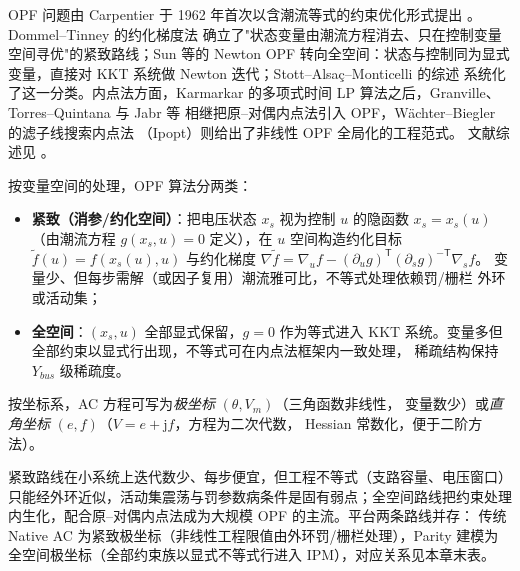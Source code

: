 \begin{remark}[发展脉络]\label{rem:opf-th-gen-history}
OPF 问题由 Carpentier 于 1962 年首次以含潮流等式的约束优化形式提出
\cite{opft:carpentier}。Dommel--Tinney 的约化梯度法\cite{opft:dommel-tinney}
确立了"状态变量由潮流方程消去、只在控制变量空间寻优"的紧致路线；Sun 等的
Newton OPF\cite{opft:sun-etal} 转向全空间：状态与控制同为显式变量，直接对
KKT 系统做 Newton 迭代；Stott--Alsa\c{c}--Monticelli 的综述
\cite{opft:stott-alsac-monticelli} 系统化了这一分类。内点法方面，Karmarkar
\cite{opft:karmarkar} 的多项式时间 LP 算法之后，Granville\cite{opft:granville}、
Torres--Quintana\cite{opft:torres-quintana} 与 Jabr 等\cite{opft:jabr-pdipm}
相继把原--对偶内点法引入 OPF，W\"achter--Biegler 的滤子线搜索内点法
\cite{opft:waechter-biegler}（Ipopt）则给出了非线性 OPF 全局化的工程范式。
文献综述见 \cite{opft:momoh-review,opft:capitanescu-scopf,opft:cain-history}。
\end{remark}

\begin{definition}\label{def:opf-th-gen-stott}
按变量空间的处理，OPF 算法分两类\cite{opft:stott-alsac-monticelli}：
\begin{itemize}
  \item \textbf{紧致（消参/约化空间）}：把电压状态 $x_s$ 视为控制 $u$ 的隐函数
        $x_s=x_s(u)$（由潮流方程 $g(x_s,u)=0$ 定义），在 $u$ 空间构造约化目标
        $\tilde f(u)=f(x_s(u),u)$ 与约化梯度 $\nabla\tilde f=\nabla_u f-
        (\partial_u g)^{\mathsf T}(\partial_s g)^{-\mathsf T}\nabla_s f$。
        变量少、但每步需解（或因子复用）潮流雅可比，不等式处理依赖罚/栅栏
        外环或活动集；
  \item \textbf{全空间}：$(x_s,u)$ 全部显式保留，$g=0$ 作为等式进入 KKT
        系统。变量多但全部约束以显式行出现，不等式可在内点法框架内一致处理，
        稀疏结构保持 $Y_{bus}$ 级稀疏度。
\end{itemize}
按坐标系，AC 方程可写为\emph{极坐标} $(\theta,V_m)$（三角函数非线性，
变量数少）或\emph{直角坐标} $(e,f)$（$V=e+\mathrm jf$，方程为二次代数，
Hessian 常数化，便于二阶方法\cite{opft:torres-quintana}）。
\end{definition}

\begin{remark}[两条路线的现代格局]\label{rem:opf-th-gen-routes}
紧致路线在小系统上迭代数少、每步便宜，但工程不等式（支路容量、电压窗口）
只能经外环近似，活动集震荡与罚参数病条件是固有弱点；全空间路线把约束处理
内生化，配合原--对偶内点法成为大规模 OPF 的主流。平台两条路线并存：
传统 Native AC 为紧致极坐标（非线性工程限值由外环罚/栅栏处理），Parity
建模为全空间极坐标（全部约束族以显式不等式行进入 IPM），对应关系见本章末表。
\end{remark}

